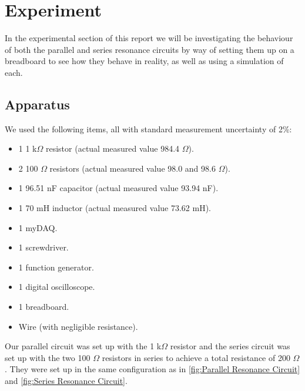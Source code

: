 \documentclass[12pt]{article}
\numberwithin{equation}{section}
\numberwithin{figure}{section}
\begin{document}
    \section{Experiment}\label{sec:Experiment}
    In the experimental section of this report we will be investigating the behaviour of both the 
    parallel and series resonance circuits by way of setting them up on a breadboard to see how they 
    behave in reality, as well as using a simulation of each. 
    \subsection{Apparatus}
    We used the following items, all with standard measurement uncertainty of 2\%:
    \begin{itemize}
        \item 1 1 k$\Omega$ resistor (actual measured value 984.4 $\Omega$).
        \item 2 100 $\Omega$ resistors (actual measured value 98.0 and 98.6 $\Omega$).
        \item 1 96.51 nF capacitor (actual measured value 93.94 nF).
        \item 1 70 mH inductor (actual measured value 73.62 mH).
        \item 1 myDAQ.
        \item 1 screwdriver.
        \item 1 function generator.
        \item 1 digital oscilloscope.
        \item 1 breadboard.
        \item Wire (with negligible resistance).
    \end{itemize}
    Our parallel circuit was set up with the 1 k$\Omega$ resistor and the series circuit was set up 
    with the two 100 $\Omega$ resistors in series to achieve a total resistance of 200 $\Omega$. 
    They were set up in the same configuration as in \autoref{fig:Parallel Resonance Circuit} and 
    \autoref{fig:Series Resonance Circuit}. 
\end{document}
